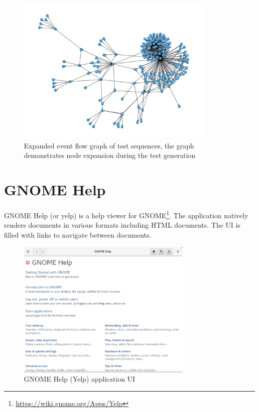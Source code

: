 \begin{figure}[H]
	\centering
	\includegraphics[width=0.85\textwidth,clip]{obrazky-figures/gnome-terminal_n_final.png}
	\caption{Expanded event flow graph of test sequences, the graph demonstrates node expansion during the test generation}
	\label{gnome-terminal-graph2}
\end{figure}

\section{GNOME Help}
GNOME Help (or yelp) is a help viewer for GNOME\footnote{\url{https://wiki.gnome.org/Apps/Yelp}}. The application natively renders documents in various formats including HTML documents. The UI is filled with links to navigate between documents.

\begin{figure}[H]
	\centering
	\includegraphics[width=0.75\textwidth,clip]{obrazky-figures/yelp-ui.png}
	\caption{GNOME Help (Yelp) application UI}
	\label{yelp_ui}
\end{figure}

